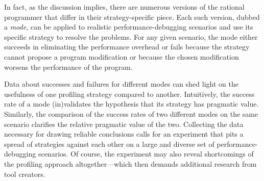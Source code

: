 In fact, as the discussion implies, there are numerous versions of the rational
programmer that differ in their strategy-specific piece. Each such version,
dubbed a \emph{mode}, can be applied to realistic performance-debugging
scenarios and use its specific strategy to resolve the problems.  For any given
scenario, the mode either succeeds in eliminating the performance overhead or
fails because the strategy cannot propose a program modification or because the
chosen modification worsens the performance of the program.

Data about successes and failures for different modes can shed light on the
usefulness of one profiling strategy compared to another. Intuitively, the
success rate of a mode (in)validates the hypothesis that its strategy has
pragmatic value. Similarly, the comparison of the success rates of two different
modes on the same scenario clarifies the relative pragmatic value of the
two. Collecting the data necessary for drawing reliable conclusions calls for an
experiment that pits a spread of strategies against each other on a large and
diverse set of performance-debugging scenarios. Of course, the experiment may
also reveal shortcomings of the profiling approach altogether---which then
demands additional research from tool creators. 

